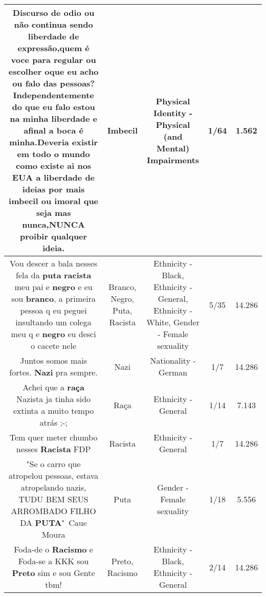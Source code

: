 \documentclass[11pt]{article}
\newlength\mylength
\begin{document}
\begin{center}
\begin{longtable}{|C{.65\mylength}|C{.30\mylength}|C{.12\mylength}|C{.12\mylength}|C{.12\mylength}|}
  \small Discurso de odio ou não continua sendo liberdade de expressão,quem é voce para regular ou escolher oque eu acho ou falo das pessoas? Independentemente do que eu falo estou na minha liberdade e afinal a boca é minha.Deveria existir em todo o mundo como existe ai nos EUA a liberdade de ideias por mais \textbf{imbecil} ou imoral que seja mas nunca,NUNCA proibir qualquer ideia.\normalsize   & Imbecil & Physical Identity - Physical (and Mental) Impairments & 1/64 & 1.562 \\  \hline
  \small Vou descer a bala nesses fela da \textbf{puta} \textbf{racista} meu pai e \textbf{negro} e eu sou \textbf{branco}, a primeira pessoa q eu peguei insultando um colega meu q e \textbf{negro} eu desci o cacete nele\normalsize   & Branco, Negro, Puta, Racista & Ethnicity - Black, Ethnicity - General, Ethnicity - White, Gender - Female sexuality & 5/35 & 14.286 \\  \hline
  \small Juntos somos mais fortes. \textbf{Nazi} pra sempre.\normalsize   & Nazi & Nationality - German & 1/7 & 14.286 \\  \hline
  \small Achei que a \textbf{raça} Nazista ja tinha sido extinta a muito tempo atrás ;-;\normalsize   & Raça & Ethnicity - General & 1/14 & 7.143 \\  \hline
  \small Tem quer meter chumbo nesses \textbf{Racista} FDP\normalsize   & Racista & Ethnicity - General & 1/7 & 14.286 \\  \hline
  \small "Se o carro que atropelou pessoas, estava atropelando nazis, TUDU BEM SEUS ARROMBADO FILHO DA \textbf{PUTA}"~Caue Moura\normalsize   & Puta & Gender - Female sexuality & 1/18 & 5.556 \\  \hline
  \small Foda-de o \textbf{Racismo} e Foda-se a KKK sou \textbf{Preto} sim e sou Gente tbm!\normalsize   & Preto, Racismo & Ethnicity - Black, Ethnicity - General & 2/14 & 14.286 \\  \hline

\end{longtable}
\end{center}
\end{document}
